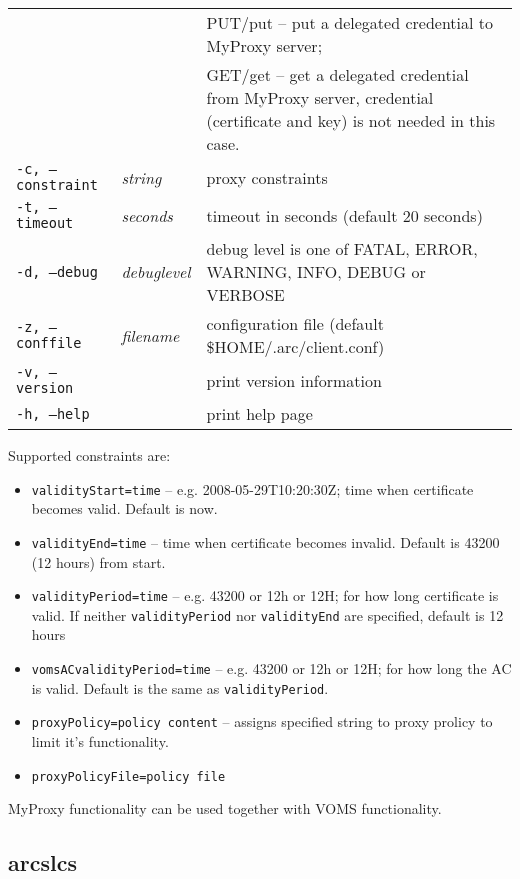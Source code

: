 \begin{longtable}{llp{8cm}}
   & &PUT/put -- put a delegated credential to MyProxy server;\\
   & &GET/get -- get a delegated credential from MyProxy server, credential (certificate and key) is not needed in this case.\\
   \texttt{-c, --constraint}& \textit{string} & proxy constraints\\
   \texttt{-t, --timeout}& \textit{seconds} & timeout in seconds (default 20 seconds)\\
   \texttt{-d, --debug}& \textit{debuglevel}&debug level is one of  FATAL, ERROR, WARNING, INFO, DEBUG or VERBOSE\\
   \texttt{-z, --conffile}&\textit{filename}& configuration file (default {\$}HOME/.arc/client.conf)\\
   \texttt{-v, --version}& & print version information\\
   \texttt{-h, --help}& & print help page\\
\end{longtable}

Supported constraints are:
\begin{itemize}
  \item \texttt{validityStart=time} -- e.g. 2008-05-29T10:20:30Z; time when certificate becomes valid. Default is now.
  \item \texttt{validityEnd=time} -- time when certificate becomes invalid. Default is 43200 (12 hours) from start.
  \item \texttt{validityPeriod=time} -- e.g. 43200 or 12h or 12H; for how long certificate is valid. If neither \texttt{validityPeriod} nor \texttt{validityEnd} are specified, default is 12 hours
  \item \texttt{vomsACvalidityPeriod=time} -- e.g. 43200 or 12h or 12H; for how long the AC is valid. Default is the same as \texttt{validityPeriod}.
  \item \texttt{proxyPolicy=policy content} -- assigns specified string to proxy prolicy to limit it's functionality.
  \item \texttt{proxyPolicyFile=policy file}
\end{itemize}

MyProxy functionality can be used together with VOMS functionality.


\subsection{arcslcs}
\label{sec:arcslcs}

